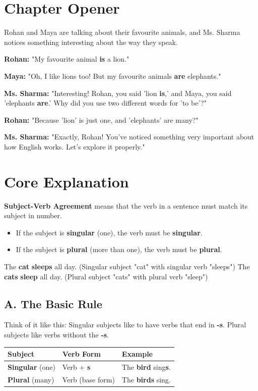 \section{Chapter Opener}
Rohan and Maya are talking about their favourite animals, and Ms. Sharma notices something interesting about the way they speak.

\textbf{Rohan:} "My favourite animal \textbf{is} a lion."

\textbf{Maya:} "Oh, I like lions too! But my favourite animals \textbf{are} elephants."

\textbf{Ms. Sharma:} "Interesting! Rohan, you said 'lion \textbf{is},' and Maya, you said 'elephants \textbf{are}.' Why did you use two different words for 'to be'?"

\textbf{Rohan:} "Because 'lion' is just one, and 'elephants' are many?"

\textbf{Ms. Sharma:} "Exactly, Rohan! You've noticed something very important about how English works. Let's explore it properly."

\section{Core Explanation}
\textbf{Subject-Verb Agreement} means that the verb in a sentence must match its subject in number.
\begin{itemize}
    \item If the subject is \textbf{singular} (one), the verb must be \textbf{singular}.
    \item If the subject is \textbf{plural} (more than one), the verb must be \textbf{plural}.
\end{itemize}

\begin{examplebox}
    The \textbf{cat} \textbf{sleeps} all day. (Singular subject "cat" with singular verb "sleeps")
    The \textbf{cats} \textbf{sleep} all day. (Plural subject "cats" with plural verb "sleep")
\end{examplebox}

\subsection*{A. The Basic Rule}
Think of it like this: Singular subjects like to have verbs that end in \textbf{-s}. Plural subjects like verbs without the \textbf{-s}.

\begin{table}[h!]
\centering
\begin{tabular}{|l|l|l|}
\hline
\textbf{Subject} & \textbf{Verb Form} & \textbf{Example} \\
\hline
\textbf{Singular} (one) & Verb + \textbf{s} & The \textbf{bird} sing\textbf{s}. \\
\textbf{Plural} (many) & Verb (base form) & The \textbf{birds} sing. \\
\hline
\end{tabular}
\end{table}

